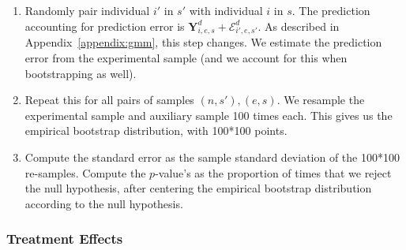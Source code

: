 \begin{enumerate}
\item Randomly pair individual $i'$ in $s'$ with individual $i$ in $s$. The prediction accounting for prediction error is $\bm{Y}_{i,e,s}^d + \bm{\mathcal{E}}_{i',e,s'}^d$. As described in Appendix~\ref{appendix:gmm}, this step changes. We estimate the prediction error from the experimental sample (and we account for this when bootstrapping as well).

\item Repeat this for all pairs of samples $(n,s'), (e,s)$. We resample the experimental sample and auxiliary sample 100 times each. This gives us the empirical bootstrap distribution, with 100*100 points.

\item Compute the standard error as the sample standard deviation of the 100*100 re-samples. Compute the $p$-value's as the proportion of times that we reject the null hypothesis, after centering the empirical bootstrap distribution according to the null hypothesis.

\end{enumerate}

\subsubsection{Treatment Effects}\label{little-TE}

